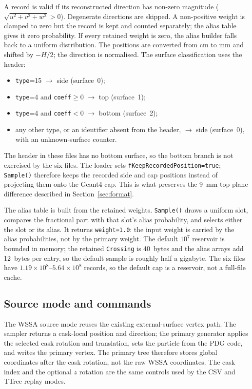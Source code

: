 \documentclass[11pt,a4paper]{article}
\begin{document}
A record is valid if its reconstructed direction has non-zero magnitude
($\sqrt{u^2+v^2+w^2}>0$).  Degenerate directions are skipped.  A non-positive
weight is clamped to zero but the record is kept and counted separately; the
alias table gives it zero probability.  If every retained weight is zero, the
alias builder falls back to a uniform distribution.  The positions are converted
from cm to mm and shifted by $-H/2$; the direction is normalised.  The surface
classification uses the header:
\begin{itemize}
  \item \texttt{type}=15 $\rightarrow$ side (surface~0);
  \item \texttt{type}=4 and \texttt{coeff}$\ge0$ $\rightarrow$ top (surface~1);
  \item \texttt{type}=4 and \texttt{coeff}$<0$ $\rightarrow$ bottom (surface~2);
  \item any other type, or an identifier absent from the header, $\rightarrow$
        side (surface~0), with an unknown-surface counter.
\end{itemize}
The header in these files has no bottom surface, so the bottom branch is not
exercised by the six files.  The loader sets
\texttt{fKeepRecordedPosition=true}; \texttt{Sample()} therefore keeps the
recorded side and cap positions instead of projecting them onto the Geant4 cap.
This is what preserves the 9~mm top-plane difference described in
Section~\ref{sec:format}.

The alias table is built from the retained weights.  \texttt{Sample()} draws a
uniform slot, compares the fractional part with that slot's alias probability,
and selects either the slot or its alias.  It returns \texttt{weight=1.0}: the
input weight is carried by the alias probabilities, not by the primary weight.
The default $10^{7}$ reservoir is bounded in memory; the retained
\texttt{Crossing} is 40~bytes and the alias arrays add 12~bytes per entry, so
the default sample is roughly half a gigabyte.  The six files have
$1.19\times10^{8}$--$5.64\times10^{8}$ records, so the default cap is a
reservoir, not a full-file cache.

\subsection{Source mode and commands}

The WSSA source mode reuses the existing external-surface vertex path.  The
sampler returns a cask-local position and direction; the primary generator
applies the selected cask rotation and translation, sets the particle from the
PDG code, and writes the primary vertex.  The primary tree therefore stores global coordinates after
the cask rotation, not the raw WSSA coordinates.  The cask index and the optional
$z$ rotation are the same controls used by the CSV and TTree replay modes.
\end{document}
